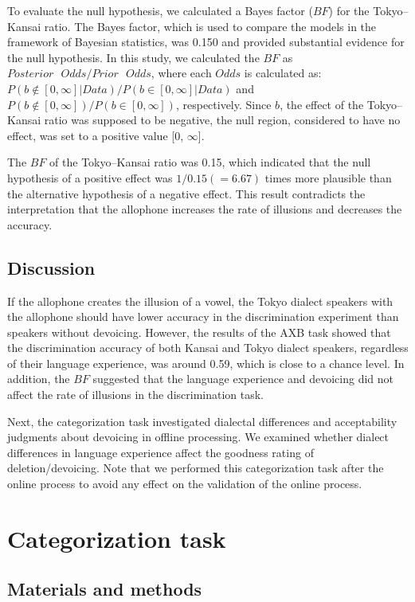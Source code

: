 \documentclass[a4paper,11pt,twocolumn]{article}
\begin{document}
To evaluate the null hypothesis, we calculated a Bayes factor ($BF$) for the Tokyo--Kansai ratio. The Bayes factor, which is used to compare the models in the framework of Bayesian statistics, was 0.150 and provided substantial evidence for the null hypothesis. In this study, we calculated the $BF$ as $Posterior \text{ }Odds / Prior \text{ }Odds$, where each $Odds$ is calculated as: $P(b\notin[0, \infty] | Data)/P(b\in[0, \infty] | Data)$ and $P(b\notin[0, \infty])/P(b\in[0, \infty])$, respectively. Since $b$, the effect of the Tokyo--Kansai ratio was supposed to be negative, the null region\cite{kruschke2010believe}, considered to have no effect, was set to a positive value [0, $\infty$].

The $BF$ of the Tokyo--Kansai ratio was 0.15, which indicated that the null hypothesis of a positive effect was $1/0.15(=6.67)$ times more plausible than the alternative hypothesis of a negative effect. This result contradicts the interpretation that the allophone increases the rate of illusions and decreases the accuracy.

\subsection{Discussion}

If the allophone creates the illusion of a vowel, the Tokyo dialect speakers with the allophone should have lower accuracy in the discrimination experiment than speakers without devoicing. However, the results of the AXB task showed that the discrimination accuracy of both Kansai and Tokyo dialect speakers, regardless of their language experience, was around 0.59, which is close to a chance level. In addition, the $BF$ suggested that the language experience and devoicing did not affect the rate of illusions in the discrimination task.

Next, the categorization task investigated dialectal differences and acceptability judgments about devoicing in offline processing. We examined whether dialect differences in language experience affect the goodness rating of deletion/devoicing. Note that we performed this categorization task after the online process to avoid any effect on the validation of the online process.

\section{Categorization task}

\subsection{Materials and methods}
\end{document}
